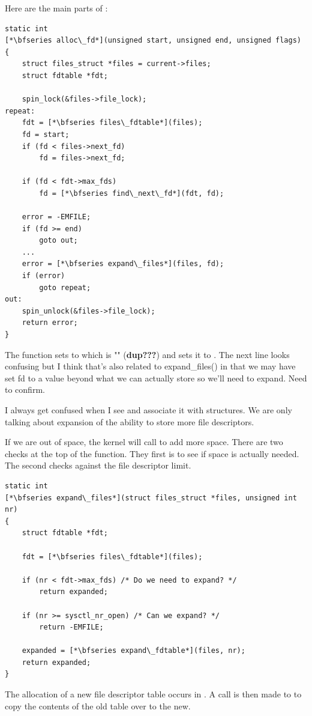 \noindent
Here are the main parts of :

\begin{lstlisting}
static int 
[*\bfseries alloc\_fd*](unsigned start, unsigned end, unsigned flags)
{
    struct files_struct *files = current->files;
    struct fdtable *fdt;
        
    spin_lock(&files->file_lock);
repeat:
    fdt = [*\bfseries files\_fdtable*](files);
    fd = start;
    if (fd < files->next_fd)
        fd = files->next_fd;
    
    if (fd < fdt->max_fds)
        fd = [*\bfseries find\_next\_fd*](fdt, fd);

    error = -EMFILE;
    if (fd >= end)
        goto out;
    ...
    error = [*\bfseries expand\_files*](files, fd);
    if (error)
        goto repeat;
out:
    spin_unlock(&files->file_lock);
    return error;
}
\end{lstlisting}

\noindent
The function sets  to  which is "" (\textbf{dup???}) and sets it to . The next line looks confusing but I think that's also related to expand\_files() in that we may have set fd to a value beyond what we can actually store so we'll need to expand. Need to confirm.

I always get confused when I see  and associate it with  structures. We are only talking about expansion of the ability to store more file descriptors. 

If we are out of space, the kernel will call  to add more space. There are two checks at the top of the function. They first is to see if space is actually needed. The second checks against the file descriptor limit.

\begin{lstlisting}
static int 
[*\bfseries expand\_files*](struct files_struct *files, unsigned int nr)
{
    struct fdtable *fdt;

    fdt = [*\bfseries files\_fdtable*](files);

    if (nr < fdt->max_fds) /* Do we need to expand? */
        return expanded;
    
    if (nr >= sysctl_nr_open) /* Can we expand? */
        return -EMFILE;
    
    expanded = [*\bfseries expand\_fdtable*](files, nr);
    return expanded;
}
\end{lstlisting}

\noindent
The allocation of a new file descriptor table occurs in . A call is then made to  to copy the contents of the old table over to the new.

